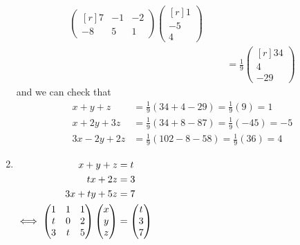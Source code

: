 \documentclass[fleqn,a4paper,11pt]{article}
\begin{document}
\begin{enumerate}[label=\textbf{\arabic*.}]
\begin{alignat*}
\begin{pmatrix*}[r]
     7 & -1 & -2 \\
     -8 & 5 & 1
    \end{pmatrix*}
    \begin{pmatrix*}[r] 1 \\ -5 \\ 4 \end{pmatrix*} \\
    && &=
    \frac 19 \begin{pmatrix*}[r] 34 \\ 4 \\ -29 \end{pmatrix*}
   \end{alignat*}
   and we can check that
   \begin{align*}
    x + y + z &= \tfrac 19(34 + 4 - 29) = \tfrac 19(9) = 1 \\
    x + 2y + 3z &= \tfrac 19(34 + 8 - 87) = \tfrac 19(-45) = -5 \\
    3x - 2y + 2z &= \tfrac 19(102 - 8 - 58) = \tfrac 19(36) = 4
   \end{align*}
  \item \(
   \begin{alignedat}[t]2
    && x + y + z &= t \\
    && tx + 2z &= 3 \\
    && 3x + ty + 5z &= 7 \\
    \iff{}&&
    \begin{pmatrix}
     1 & 1 & 1 \\
     t & 0 & 2 \\
     3 & t & 5
    \end{pmatrix}
    \begin{pmatrix} x \\ y \\ z \end{pmatrix}
     &= \begin{pmatrix} t \\ 3 \\ 7 \end{pmatrix}
   \end{alignedat}\)


\end{enumerate}
\end{document}

